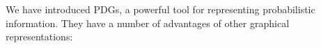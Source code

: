 \documentclass{article}
\theoremstyle{plain}
\theoremstyle{definition}
\theoremstyle{remark}
\numberwithin{equation}{section}
\begin{document}
We have introduced PDGs, a powerful tool for representing
probabilistic information. 
They have a number of advantages of other
graphical representations:
\end{document}
